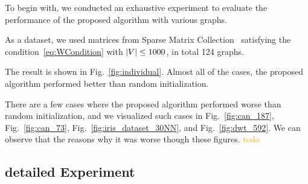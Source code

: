 \documentclass[dvipdfmx,10pt,journal,compsoc]{IEEEtran}
\newcommand{\orange}[1]{\textcolor{orange}{#1}}
\begin{document}
To begin with, we conducted an exhaustive experiment to evaluate the performance of the proposed algorithm with various graphs.

As a dataset, we used matrices from Sparse Matrix Collection~\cite{davis2011university} satisfying the condition~\eqref{eq:WCondition} with $\abs{V} \leq 1000$, in total 124 graphs.

The result is shown in Fig.~\ref{fig:individual}.
Almost all of the cases, the proposed algorithm performed better than random initialization.

There are a few cases where the proposed algorithm performed worse than random initialization, and we visualized such cases in Fig.~\ref{fig:can_187}, Fig.~\ref{fig:can_73}, Fig.~\ref{fig:iris_dataset_30NN}, and Fig.~\ref{fig:dwt_592}.
We can observe that the reasons why it was worse though these figures. \orange{todo}

\subsection{detailed Experiment}\label{ssec:exprDetail}
\end{document}
